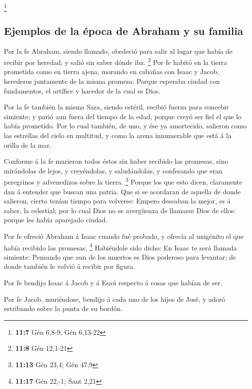\footnote{\textbf{11:7} Gén 6,8-9; Gén 6,13-22}

\hypertarget{ejemplos-de-la-uxe9poca-de-abraham-y-su-familia}{%
\subsection{Ejemplos de la época de Abraham y su
familia}\label{ejemplos-de-la-uxe9poca-de-abraham-y-su-familia}}

 Por la fe Abraham, siendo llamado, obedeció para salir al
lugar que había de recibir por heredad; y salió sin saber dónde iba.
\footnote{\textbf{11:8} Gén 12,1-21}  Por fe habitó en la
tierra prometida como en tierra ajena, morando en cabañas con Isaac y
Jacob, herederos juntamente de la misma promesa:  Porque
esperaba ciudad con fundamentos, el artífice y hacedor de la cual es
Dios.

 Por la fe también la misma Sara, siendo estéril, recibió
fuerza para concebir simiente; y parió aun fuera del tiempo de la edad,
porque creyó ser fiel el que lo había prometido.  Por lo
cual también, de uno, y ése ya amortecido, salieron como las estrellas
del cielo en multitud, y como la arena innumerable que está á la orilla
de la mar.

 Conforme á la fe murieron todos éstos sin haber recibido
las promesas, sino mirándolas de lejos, y creyéndolas, y saludándolas, y
confesando que eran peregrinos y advenedizos sobre la tierra.
\footnote{\textbf{11:13} Gén 23,4; Gén 47,9}  Porque los
que esto dicen, claramente dan á entender que buscan una patria.
 Que si se acordaran de aquella de donde salieron, cierto
tenían tiempo para volverse:  Empero deseaban la mejor,
es á saber, la celestial; por lo cual Dios no se avergüenza de llamarse
Dios de ellos: porque les había aparejado ciudad.

 Por fe ofreció Abraham á Isaac cuando fué probado, y
ofrecía al unigénito el que había recibido las promesas, \footnote{\textbf{11:17}
  Gén 22,-1; Sant 2,21}  Habiéndole sido dicho: En Isaac
te será llamada simiente:  Pensando que aun de los
muertos es Dios poderoso para levantar; de donde también le volvió á
recibir por figura.

 Por fe bendijo Isaac á Jacob y á Esaú respecto á cosas
que habían de ser.

 Por fe Jacob, muriéndose, bendijo á cada uno de los
hijos de José, y adoró estribando sobre la punta de su bordón.

